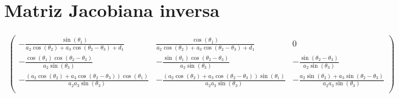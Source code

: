 \documentclass[a4paper,12pt]{article}
\begin{document}
\section{Matriz Jacobiana inversa}
\label{sec:inv_jacobian}

\begin{align*}
    \begin{pmatrix}
        - \frac{\sin{\left(\theta_{1} \right)}}{a_{2} \cos{\left(\theta_{2} \right)} + a_{3} \cos{\left(\theta_{2} - \theta_{3} \right)} + d_{1}}                                                 & \frac{\cos{\left(\theta_{1} \right)}}{a_{2} \cos{\left(\theta_{2} \right)} + a_{3} \cos{\left(\theta_{2} - \theta_{3} \right)} + d_{1}}                                                   & 0                                                                                                                                             \\
        - \frac{\cos{\left(\theta_{1} \right)} \cos{\left(\theta_{2} - \theta_{3} \right)}}{a_{2} \sin{\left(\theta_{3} \right)}}                                                                 & - \frac{\sin{\left(\theta_{1} \right)} \cos{\left(\theta_{2} - \theta_{3} \right)}}{a_{2} \sin{\left(\theta_{3} \right)}}                                                                 & - \frac{\sin{\left(\theta_{2} - \theta_{3} \right)}}{a_{2} \sin{\left(\theta_{3} \right)}}                                                    \\
        - \frac{\left(a_{2} \cos{\left(\theta_{2} \right)} + a_{3} \cos{\left(\theta_{2} - \theta_{3} \right)}\right) \cos{\left(\theta_{1} \right)}}{a_{2} a_{3} \sin{\left(\theta_{3} \right)}} & - \frac{\left(a_{2} \cos{\left(\theta_{2} \right)} + a_{3} \cos{\left(\theta_{2} - \theta_{3} \right)}\right) \sin{\left(\theta_{1} \right)}}{a_{2} a_{3} \sin{\left(\theta_{3} \right)}} & - \frac{a_{2} \sin{\left(\theta_{2} \right)} + a_{3} \sin{\left(\theta_{2} - \theta_{3} \right)}}{a_{2} a_{3} \sin{\left(\theta_{3} \right)}} \\
    \end{pmatrix}
\end{align*}

\newpage
\printbibliography
\end{document}
